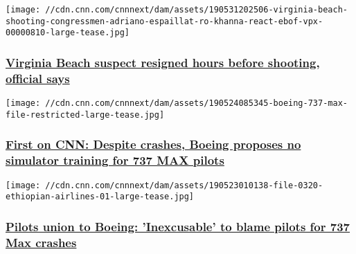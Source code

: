 \href{/2019/06/01/us/virginia-beach-suspect/index.html}{}

\texttt{[image: //cdn.cnn.com/cnnnext/dam/assets/190531202506-virginia-beach-shooting-congressmen-adriano-espaillat-ro-khanna-react-ebof-vpx-00000810-large-tease.jpg]}

\hypertarget{virginia-beach-suspect-resigned-hours-before-shooting-official-says}{%
\subsubsection{\texorpdfstring{\href{/2019/06/01/us/virginia-beach-suspect/index.html}{Virginia
Beach suspect resigned hours before shooting, official
says}}{Virginia Beach suspect resigned hours before shooting, official says}}\label{virginia-beach-suspect-resigned-hours-before-shooting-official-says}}

\href{/2019/05/30/politics/737-max-computer-simulator/index.html}{}

\texttt{[image: //cdn.cnn.com/cnnnext/dam/assets/190524085345-boeing-737-max-file-restricted-large-tease.jpg]}

\hypertarget{first-on-cnn-despite-crashes-boeing-proposes-no-simulator-training-for-737-max-pilots}{%
\subsubsection{\texorpdfstring{\href{/2019/05/30/politics/737-max-computer-simulator/index.html}{First
on CNN: Despite crashes, Boeing proposes no simulator training for 737
MAX
pilots}}{First on CNN: Despite crashes, Boeing proposes no simulator training for 737 MAX pilots}}\label{first-on-cnn-despite-crashes-boeing-proposes-no-simulator-training-for-737-max-pilots}}

\href{/2019/05/23/business/american-airlines-boeing-pilots-union/index.html}{}

\texttt{[image: //cdn.cnn.com/cnnnext/dam/assets/190523010138-file-0320-ethiopian-airlines-01-large-tease.jpg]}

\hypertarget{pilots-union-to-boeing-inexcusable-to-blame-pilots-for-737-max-crashes}{%
\subsubsection{\texorpdfstring{\href{/2019/05/23/business/american-airlines-boeing-pilots-union/index.html}{Pilots
union to Boeing: 'Inexcusable' to blame pilots for 737 Max
crashes}}{Pilots union to Boeing: 'Inexcusable' to blame pilots for 737 Max crashes}}\label{pilots-union-to-boeing-inexcusable-to-blame-pilots-for-737-max-crashes}}


